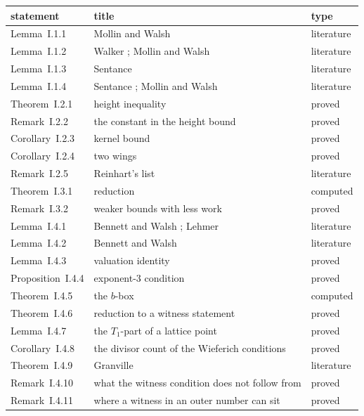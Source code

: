 \begingroup\small
\begin{longtable}{l p{7.2cm} l}
\hline
statement & title & type \\
\hline
\endhead
Lemma~I.1.1 & Mollin and Walsh {\cite[Theorem, p.~110]{MollinWalsh1986a}} & literature \\
Lemma~I.1.2 & Walker {\cite[Theorems 2.2(3) and 2.5]{Walker1976}}; Mollin and Walsh {\cite[p.~111]{MollinWalsh1986a}} & literature \\
Lemma~I.1.3 & Sentance {\cite[Theorem and Converse, p.~272]{Sentance1981}} & literature \\
Lemma~I.1.4 & Sentance {\cite[p.~272]{Sentance1981}}; Mollin and Walsh {\cite[Lemma~1.1]{MollinWalsh1986b}} & literature \\
Theorem~I.2.1 & height inequality & proved \\
Remark~I.2.2 & the constant in the height bound & proved \\
Corollary~I.2.3 & kernel bound & proved \\
Corollary~I.2.4 & two wings & proved \\
Remark~I.2.5 & Reinhart's list & literature \\
Theorem~I.3.1 & reduction & computed \\
Remark~I.3.2 & weaker bounds with less work & proved \\
Lemma~I.4.1 & Bennett and Walsh {\cite[proof of Lemma~3.3, p.~3484]{BennettWalsh1999}}; Lehmer {\cite{Lehmer1930}} & literature \\
Lemma~I.4.2 & Bennett and Walsh {\cite[Theorem~1.2]{BennettWalsh1999}} & literature \\
Lemma~I.4.3 & valuation identity & proved \\
Proposition~I.4.4 & exponent-3 condition & proved \\
Theorem~I.4.5 & the $b$-box & computed \\
Theorem~I.4.6 & reduction to a witness statement & proved \\
Lemma~I.4.7 & the $T_1$-part of a lattice point & proved \\
Corollary~I.4.8 & the divisor count of the Wieferich conditions & proved \\
Theorem~I.4.9 & Granville {\cite[Theorem, p.~216]{Granville1986}} & literature \\
Remark~I.4.10 & what the witness condition does not follow from & proved \\
Remark~I.4.11 & where a witness in an outer number can sit & proved \\

\end{longtable}

